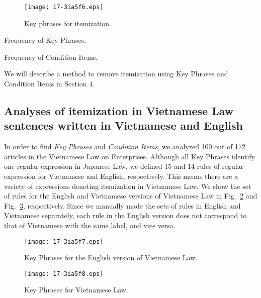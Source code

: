 \documentclass[english]{jnlp_1.4}
\begin{document}
\begin{figure}[b]
\begin{center}
\texttt{[image: 17-3ia5f6.eps]}
\end{center}
\caption{Key phrases for itemization.}
\label{fig:keyphrase}
\end{figure}
\begin{table}[b]
\begin{minipage}[t]{0.45\textwidth}
\caption{Frequency of Key Phrases.}
\label{tab:appearancekey}

   \end{minipage}
\hfill
   \begin{minipage}[t]{0.45\textwidth}
\caption{Frequency of Condition Items.}
\label{tab:appearancecon}

\end{minipage}
\end{table}


We will describe a method to remove itemization using Key Phrases and
Condition Items in Section 4.



\subsection{Analyses of itemization in Vietnamese Law sentences written
  in Vietnamese and English}

In order to find {\it Key Phrases} and {\it Condition Items},
we analyzed 100 out of 172 articles in the Vietnamese Law on Enterprises.
Although all Key Phrases identify one regular expression in Japanese 
Law, 
we defined 15 and 14 rules of regular expression for Vietnamese and
English, respectively.
This means there are a variety of expressions denoting itemization
in Vietnamese Law.
We show the set of rules for the English and Vietnamese versions
of Vietnamese Law in Fig.~\ref{fig:kp_english} and
Fig.~\ref{fig:kp_vietnamese}, respectively.
Since we manually made the sets of rules in English and Vietnamese separately, 
each rule in the English version does not correspond to that of
Vietnamese with the same label, and vice versa.

\begin{figure}[b]
\begin{center}
\texttt{[image: 17-3ia5f7.eps]}
\end{center}
\caption{Key Phrases for the English version of Vietnamese Law.}
\label{fig:kp_english}
\end{figure}
\begin{figure}[b]
\begin{center}
\texttt{[image: 17-3ia5f8.eps]}
\end{center}
\caption{Key Phrases for Vietnamese Law.}
\label{fig:kp_vietnamese}
\end{figure}
\end{document}
